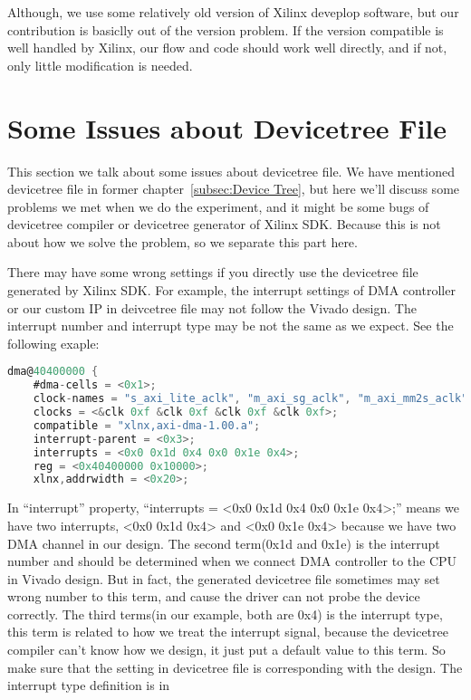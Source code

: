 Although, we use some relatively old version of Xilinx deveplop software, but our contribution is basiclly out of the version problem. If the version compatible is well handled by Xilinx, our flow and code should work well directly, and if not, only little modification is needed.

\newpage
\section{Some Issues about Devicetree File}
\label{sec:Some Issues about Devicetree File}
This section we talk about some issues about devicetree file. We have mentioned devicetree file in former chapter~\ref{subsec:Device Tree}, but here we'll discuss some problems we met when we do the experiment, and it might be some bugs of devicetree compiler or devicetree generator of Xilinx SDK. Because this is not about how we solve the problem, so we separate this part here.

There may have some wrong settings if you directly use the devicetree file generated by Xilinx SDK. For example, the interrupt settings of DMA controller or our custom IP in deivcetree file may not follow the Vivado design. The interrupt number and interrupt type 
may be not the same as we expect. See the following exaple:{}

{\renewcommand\baselinestretch{0.8}\selectfont
\begin{lstlisting}[frame=single,language=C]
dma@40400000 {
	#dma-cells = <0x1>;
	clock-names = "s_axi_lite_aclk", "m_axi_sg_aclk", "m_axi_mm2s_aclk", "m_axi_s2mm_aclk";
	clocks = <&clk 0xf &clk 0xf &clk 0xf &clk 0xf>;
	compatible = "xlnx,axi-dma-1.00.a";
	interrupt-parent = <0x3>;
	interrupts = <0x0 0x1d 0x4 0x0 0x1e 0x4>;
	reg = <0x40400000 0x10000>;
	xlnx,addrwidth = <0x20>;
\end{lstlisting}
\par}

In ``interrupt'' property,	``interrupts = <0x0 0x1d 0x4 0x0 0x1e 0x4>;'' means we have two interrupts, <0x0 0x1d 0x4> and <0x0 0x1e 0x4> because we have two DMA channel in our design. The second term(0x1d and 0x1e) is the interrupt number and should be determined when we connect DMA controller to the CPU in Vivado design. But in fact, the generated devicetree file sometimes may set wrong number to this term, and  cause the driver can not probe the device correctly. The third terms(in our example, both are 0x4) is the interrupt type, this term is related to how we treat the interrupt signal, because the devicetree compiler can't know how we design, it just put a default value to this term. So make sure that the setting in devicetree file is corresponding with the design. The interrupt type definition is in \cite{intterrupttypes}

